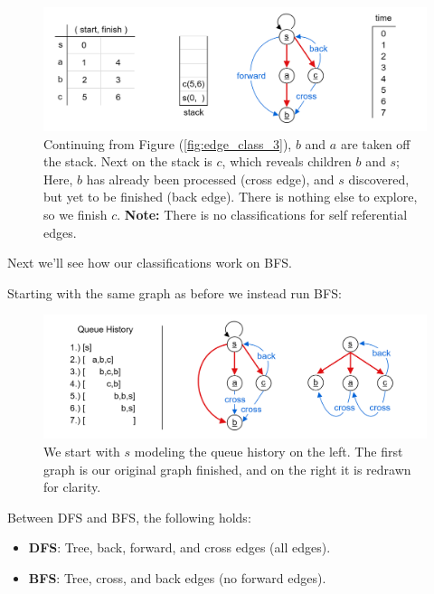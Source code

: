 \begin{figure}[h]
    \begin{center}
    \includegraphics[width=1\textwidth]{./Sections/graphs/edges/eg_4.png}
    \end{center}
     \caption{Continuing from Figure (\ref{fig:edge_class_3}), $b$ and $a$ are taken off the stack. 
     Next on the stack is $c$, which reveals children $b$ and $s$; Here, $b$ has already been processed (cross edge), and 
     $s$ discovered, but yet to be finished (back edge). There is nothing else to explore, so we finish $c$.
     \textbf{Note:} There is no classifications for self referential edges.}
     \label{fig:edge_class_4}
  \end{figure}

\noindent
Next we'll see how our classifications work on BFS.

\newpage 

\noindent
Starting with the same graph as before we instead run BFS:

\begin{figure}[h]
    \begin{center}
    \includegraphics[width=1\textwidth]{./Sections/graphs/edges/eg_5.png}
    \end{center}
     \caption{We start with $s$ modeling the queue history on the left. The first graph is our original graph finished, and on the right it is 
     redrawn for clarity.}
     \label{fig:edge_class_5}
  \end{figure}

\begin{theo}
    
    Between DFS and BFS, the following holds:
    \begin{itemize}
        \item \textbf{DFS}: Tree, back, forward, and cross edges (all edges).
        \item \textbf{BFS}: Tree, cross, and back edges (no forward edges).
    \end{itemize}
\end{theo}

